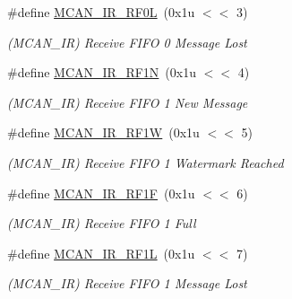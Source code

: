 \begin{DoxyCompactItemize}
\mbox{\label{group__SAME70__MCAN_gae764db6f724695066df806871647f144}} 
\#define \mbox{\hyperlink{group__SAME70__MCAN_gae764db6f724695066df806871647f144}{M\+C\+A\+N\+\_\+\+I\+R\+\_\+\+R\+F0L}}~(0x1u $<$$<$ 3)
\begin{DoxyCompactList}\small\item\em (M\+C\+A\+N\+\_\+\+IR) Receive F\+I\+FO 0 Message Lost \end{DoxyCompactList}\item 
\mbox{\label{group__SAME70__MCAN_ga9922ff338c779136761e64d0a5a09473}} 
\#define \mbox{\hyperlink{group__SAME70__MCAN_ga9922ff338c779136761e64d0a5a09473}{M\+C\+A\+N\+\_\+\+I\+R\+\_\+\+R\+F1N}}~(0x1u $<$$<$ 4)
\begin{DoxyCompactList}\small\item\em (M\+C\+A\+N\+\_\+\+IR) Receive F\+I\+FO 1 New Message \end{DoxyCompactList}\item 
\mbox{\label{group__SAME70__MCAN_gacefc65a4f21c0654033ad381c3e1a7e8}} 
\#define \mbox{\hyperlink{group__SAME70__MCAN_gacefc65a4f21c0654033ad381c3e1a7e8}{M\+C\+A\+N\+\_\+\+I\+R\+\_\+\+R\+F1W}}~(0x1u $<$$<$ 5)
\begin{DoxyCompactList}\small\item\em (M\+C\+A\+N\+\_\+\+IR) Receive F\+I\+FO 1 Watermark Reached \end{DoxyCompactList}\item 
\mbox{\label{group__SAME70__MCAN_gadc72250dd1be6299a69c6df46e1bd293}} 
\#define \mbox{\hyperlink{group__SAME70__MCAN_gadc72250dd1be6299a69c6df46e1bd293}{M\+C\+A\+N\+\_\+\+I\+R\+\_\+\+R\+F1F}}~(0x1u $<$$<$ 6)
\begin{DoxyCompactList}\small\item\em (M\+C\+A\+N\+\_\+\+IR) Receive F\+I\+FO 1 Full \end{DoxyCompactList}\item 
\mbox{\label{group__SAME70__MCAN_gafdb85b7b09ed00489b6d1f558c8c9479}} 
\#define \mbox{\hyperlink{group__SAME70__MCAN_gafdb85b7b09ed00489b6d1f558c8c9479}{M\+C\+A\+N\+\_\+\+I\+R\+\_\+\+R\+F1L}}~(0x1u $<$$<$ 7)
\begin{DoxyCompactList}\small\item\em (M\+C\+A\+N\+\_\+\+IR) Receive F\+I\+FO 1 Message Lost \end{DoxyCompactList}\item 
$$
\end{DoxyCompactItemize}
